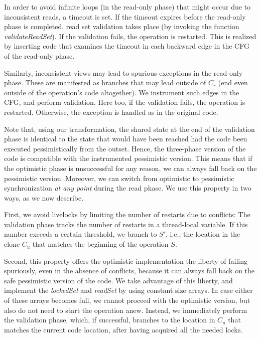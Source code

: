 In order to avoid infinite loops (in the read-only phase) that might occur due to inconsistent reads, a timeout is set.
If the timeout expires before the read-only phase is completed, read set
validation takes place (by invoking the function \emph{validateReadSet}). If the validation fails, the operation is restarted.
This is realized by inserting code that examines the timeout in each backward edge in the CFG of the read-only phase.

Similarly, inconsistent views may lead to spurious exceptions in the read-only phase. These are manifested as branches that
may lead outside of $C_r$ (end even outside of the operation's code altogether). We instrument such edges in the CFG, and
perform validation. Here too, if the validation fails, the operation is restarted. Otherwise, the exception is handled as in
the original code.


Note that, using our transformation, the shared state at the end of the validation phase
is identical to the state that would have been reached had the code been executed pessimistically from
the outset. Hence, the three-phase version of the code is compatible with the instrumented
pessimistic version. This means that if the optimistic phase is unsuccessful for any reason, we can always
fall back on the pessimistic version. Moreover, we can switch from optimistic to pessimistic synchronization
\emph{at any point} during the read phase.
We use this property in two ways, as we now describe.

First, we avoid livelocks by limiting the number of restarts due to conflicts:
The validation phase tracks the number of restarts in a thread-local variable.
If this number exceeds a certain threshold, we branch to $S'$, i.e., the location in the clone $C_u$ that matches
the beginning of the operation $S$.

Second, this property offers the optimistic implementation the liberty of
failing spuriously, even in the absence of conflicts, because it can always fall back on the safe pessimistic version
of the code.
We take advantage of this liberty, and implement the \emph{lockedSet} and \emph{readSet} by using constant size arrays.
In case either of these arrays becomes full, we cannot proceed with the optimistic version, but also
do not need to start the operation anew.
Instead, we immediately perform the validation phase, which, if successful, branches to the location in $C_u$
that matches the current code location, after having acquired all the needed locks.
